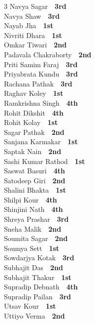 \documentclass[11pt,a4paper]{article}
\begin{document}
\begin{multicols}{3}
Navya Sagar~\dotfill~\textbf{3rd}\\
Navya Shaw~\dotfill~\textbf{3rd}\\
Nayab Jha~\dotfill~\textbf{1st}\\
Nivriti Dhara~\dotfill~\textbf{1st}\\
Omkar Tiwari~\dotfill~\textbf{2nd}\\
Padavala Chakraborty~\dotfill~\textbf{2nd}\\
Priti Samim Faraj~\dotfill~\textbf{3rd}\\
Priyabrata Kundu~\dotfill~\textbf{3rd}\\
Rachana Pathak~\dotfill~\textbf{3rd}\\
Raghav Koley~\dotfill~\textbf{1st}\\
Ramkrishna Singh~\dotfill~\textbf{4th}\\
Rohit Dikshit~\dotfill~\textbf{4th}\\
Rohit Kolay~\dotfill~\textbf{1st}\\
Sagar Pathak~\dotfill~\textbf{2nd}\\
Sanjana Karmakar~\dotfill~\textbf{1st}\\
Saptak Nain~\dotfill~\textbf{2nd}\\
Sashi Kumar Rathod~\dotfill~\textbf{1st}\\
Saswat Basuri~\dotfill~\textbf{4th}\\
Satodeep Giri~\dotfill~\textbf{2nd}\\
Shalini Bhakta~\dotfill~\textbf{1st}\\
Shilpi Kour~\dotfill~\textbf{4th}\\
Shinjini Nath~\dotfill~\textbf{4th}\\
Shreya Prashar~\dotfill~\textbf{3rd}\\
Sneha Malik~\dotfill~\textbf{2nd}\\
Soumita Sagar~\dotfill~\textbf{2nd}\\
Soumya Sett~\dotfill~\textbf{1st}\\
Sowdarjya Kotak~\dotfill~\textbf{3rd}\\
Subhajit Das~\dotfill~\textbf{2nd}\\
Subhajit Thakur~\dotfill~\textbf{1st}\\
Supradip Debnath~\dotfill~\textbf{4th}\\
Supradip Pailan~\dotfill~\textbf{3rd}\\
Utsav Kour~\dotfill~\textbf{1st}\\
Uttiyo Verma~\dotfill~\textbf{2nd}\\
\end{multicols}
\endgroup
\end{document}
